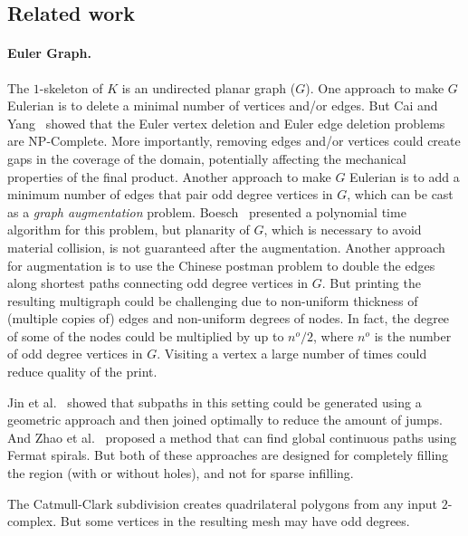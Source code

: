 \subsection{Related work}

%

%
\paragraph{Euler Graph.} \label{sec:previouseulerwork}
The $1$-skeleton of $K$ is an undirected planar graph ($G$).
One approach to make $G$ Eulerian is to delete a minimal number of vertices and/or edges.
But Cai and Yang~\cite{CaYa2011} showed that the Euler vertex deletion and Euler edge deletion problems are NP-Complete.
More importantly, removing edges and/or vertices could create gaps in the coverage of the domain, potentially affecting the mechanical properties of the final product.
Another approach to make $G$ Eulerian is to add a minimum number of edges that pair odd degree vertices in $G$, which can be cast as a \emph{graph augmentation} problem.
Boesch~\cite{TCR1977} presented a polynomial time algorithm for this problem, but planarity of $G$, which is necessary to avoid material collision, is not guaranteed after the augmentation.
Another approach for augmentation is to use the Chinese postman problem to double the edges along shortest paths connecting odd degree vertices in $G$.
But printing the resulting multigraph could be challenging due to non-uniform thickness of (multiple copies of) edges and non-uniform degrees of nodes.
In fact, the degree of some of the nodes could be multiplied by up to $n^o/2$, where $n^o$ is the number of odd degree vertices in $G$.
Visiting a vertex a large number of times could reduce quality of the print.

Jin et al.~\cite{JiHeFuZhDu2017} showed that subpaths in this setting could be generated using a geometric approach and then joined optimally to reduce the amount of jumps.
And Zhao et al.~\cite{ZhGuHuGaYoChBeZhCoDaBa2016} proposed a method that can find global continuous paths using Fermat spirals.
But both of these approaches are designed for completely filling the region (with or without holes), and not for sparse infilling.
   
The Catmull-Clark subdivision \cite{CatmullClark1978} creates quadrilateral polygons from any input $2$-complex.
But some vertices in the resulting mesh may have odd degrees.

